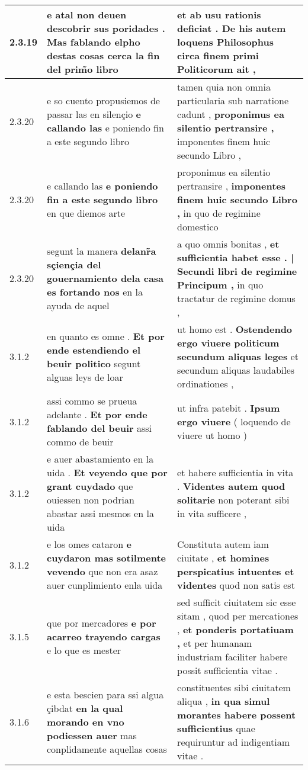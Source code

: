 \begin{tabular}{|p{1cm}|p{6.5cm}|p{6.5cm}|}
2.3.19 & e atal non deuen descobrir sus poridades . \textbf{ Mas fablando elpho destas cosas } cerca la fin del prim̃o libro & et ab usu rationis deficiat . \textbf{ De his autem loquens Philosophus } circa finem primi Politicorum ait , \\\hline
2.3.20 & e so cuento propusiemos de passar las en silençio \textbf{ e callando las } e poniendo fin a este segundo libro & tamen quia non omnia particularia sub narratione cadunt , \textbf{ proponimus ea silentio pertransire , } imponentes finem huic secundo Libro , \\\hline
2.3.20 & e callando las \textbf{ e poniendo fin a este segundo libro } en que diemos arte & proponimus ea silentio pertransire , \textbf{ imponentes finem huic secundo Libro , } in quo de regimine domestico \\\hline
2.3.20 & segunt la manera \textbf{ delanr̃a sçiençia del gouernamiento dela casa es fortando nos } en la ayuda de aquel & a quo omnis bonitas , \textbf{ et sufficientia habet esse . | Secundi libri de regimine Principum , } in quo tractatur de regimine domus , \\\hline
3.1.2 & en quanto es omne . \textbf{ Et por ende estendiendo el beuir politico } segunt alguas leys de loar & ut homo est . \textbf{ Ostendendo ergo viuere politicum secundum aliquas leges } et secundum aliquas laudabiles ordinationes , \\\hline
3.1.2 & assi commo se prueua adelante . \textbf{ Et por ende fablando del beuir } assi commo de beuir & ut infra patebit . \textbf{ Ipsum ergo viuere } ( loquendo de viuere ut homo ) \\\hline
3.1.2 & e auer abastamiento en la uida . \textbf{ Et veyendo que por grant cuydado } que ouiessen non podrian abastar assi mesmos en la uida & et habere sufficientia in vita . \textbf{ Videntes autem quod solitarie } non poterant sibi in vita sufficere , \\\hline
3.1.2 & e los omes cataron \textbf{ e cuydaron mas sotilmente vevendo } que non era asaz auer cunplimiento enla uida & Constituta autem iam ciuitate , \textbf{ et homines perspicatius intuentes et videntes } quod non satis est \\\hline
3.1.5 & que por mercadores \textbf{ e por acarreo trayendo cargas } e lo que es mester & sed sufficit ciuitatem sic esse sitam , quod per mercationes , \textbf{ et ponderis portatiuam , } et per humanam industriam faciliter habere possit sufficientia vitae . \\\hline
3.1.6 & e esta bescien para ssi algua çibdat \textbf{ en la qual morando en vno podiessen auer } mas conplidamente aquellas cosas & constituentes sibi ciuitatem aliqua , \textbf{ in qua simul morantes habere possent sufficientius } quae requiruntur ad indigentiam vitae . \\\hline

\end{tabular}
